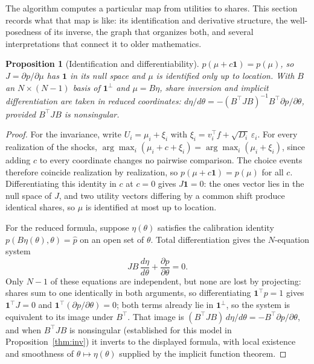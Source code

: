 \documentclass[12pt]{article}
\newtheorem{proposition}{Proposition}
\theoremstyle{remark}
\begin{document}
The algorithm computes a particular map from utilities to shares. This
section records what that map is like: its identification and
derivative structure, the well-posedness of its inverse, the graph that
organizes both, and several interpretations that connect it to older
mathematics.

\begin{proposition}[Identification and differentiability]\label{prop:ident}
$p(\mu + c\mathbf{1}) = p(\mu)$, so $J = \partial p/\partial \mu$ has
$\mathbf{1}$ in its null space and $\mu$ is identified only up to location.
With $B$ an $N \times (N-1)$ basis of $\mathbf{1}^\perp$ and $\mu = B\eta$,
share inversion and implicit differentiation are taken in reduced coordinates:
$d\eta/d\theta = -(B^\top J B)^{-1} B^\top \partial p/\partial\theta$,
provided $B^\top J B$ is nonsingular.
\end{proposition}
\begin{proof}
For the invariance, write $U_i = \mu_i + \xi_i$ with $\xi_i = v_i^\top f
+ \sqrt{D_i}\,\varepsilon_i$. For every realization of the shocks,
$\arg\max_i (\mu_i + c + \xi_i) = \arg\max_i (\mu_i + \xi_i)$, since
adding $c$ to every coordinate changes no pairwise comparison. The choice
events therefore coincide realization by realization, so $p(\mu +
c\mathbf{1}) = p(\mu)$ for all $c$. Differentiating this identity in $c$
at $c = 0$ gives $J\mathbf{1} = 0$: the ones vector lies in the null space
of $J$, and two utility vectors differing by a common shift produce
identical shares, so $\mu$ is identified at most up to location.

For the reduced formula, suppose $\eta(\theta)$ satisfies the calibration
identity $p(B\eta(\theta), \theta) = \hat p$ on an open set of
$\theta$. Total differentiation gives the $N$-equation system
\[
J B \,\frac{d\eta}{d\theta} + \frac{\partial p}{\partial \theta}
= 0 .
\]
Only $N - 1$ of these equations are independent, but none are lost by
projecting: shares sum to one identically in both arguments, so
differentiating $\mathbf{1}^\top p = 1$ gives $\mathbf{1}^\top J = 0$
and $\mathbf{1}^\top (\partial p / \partial \theta) = 0$; both terms
already lie in $\mathbf{1}^\perp$, so the system is equivalent to its
image under $B^\top$. That image is $(B^\top J B)\, d\eta/d\theta =
-B^\top \partial p/\partial\theta$, and when $B^\top J B$ is
nonsingular (established for this model in Proposition~\ref{thm:inv}) it
inverts to the displayed formula, with local existence and smoothness of
$\theta \mapsto \eta(\theta)$ supplied by the implicit function theorem.
\end{proof}
\end{document}
